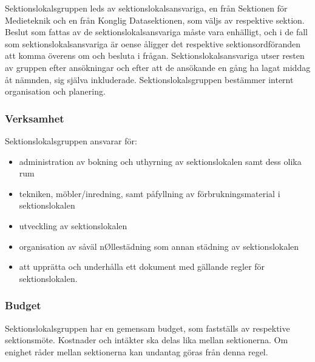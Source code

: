 \documentclass{dgovdoc}
\begin{document}
Sektionslokalsgruppen leds av sektionslokalsansvariga, en från Sektionen för Medieteknik och en från Konglig Datasektionen, som väljs av respektive sektion. Beslut som fattas av de sektionslokalsansvariga måste vara enhälligt, och i de fall som sektionslokalsansvariga är oense åligger det respektive sektionsordföranden att komma överens
om och besluta i frågan. Sektionslokalsansvariga utser resten av gruppen efter ansökningar och efter att de ansökande en gång ha lagat middag åt nämnden, sig själva inkluderade. Sektionslokalsgruppen bestämmer internt organisation och planering.

\subsubsection{Verksamhet}

Sektionslokalsgruppen ansvarar för:

\begin{itemize}
  \item administration av bokning och uthyrning av sektionslokalen samt dess olika rum
\end{itemize}

\begin{itemize}
  \item tekniken, möbler/inredning, samt påfyllning av förbrukningsmaterial i sektionslokalen
\end{itemize}

\begin{itemize}
  \item utveckling av sektionslokalen
\end{itemize}

\begin{itemize}
  \item organisation av såväl nØllestädning som annan städning av sektionslokalen
\end{itemize}

\begin{itemize}
  \item att upprätta och underhålla ett dokument med gällande regler för sektionslokalen.
\end{itemize}

\subsubsection{Budget}

Sektionslokalsgruppen har en gemensam budget, som fastställs av respektive sektionsmöte. Kostnader och intäkter ska delas lika mellan sektionerna. Om enighet råder mellan sektionerna kan undantag göras från denna regel.
\end{document}
